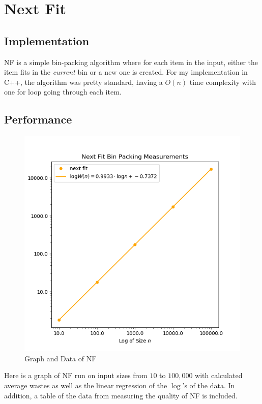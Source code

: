 \documentclass{article}
\begin{document}
\section{Next Fit}
\subsection{Implementation}
    NF is a simple bin-packing algorithm where for each item in the input, 
    either the item fits in the \textit{current} bin or a new one is created. 
    For my implementation in C++, the algorithm was pretty standard, having a
    $O(n)$ time complexity with one for loop going through each item.
\subsection{Performance}
    \begin{figure}[H]
        \centering
        \includegraphics[scale=0.60]{"../images/next-fit"}
        \caption{Graph and Data of NF}
    \end{figure}
    Here is a graph of NF run on input sizes from $10$ to $100,000$ with 
    calculated average wastes as well as the linear regression of the $\log$'s
    of the data. In addition, a table of the data from measuring the quality of
    NF is included.
\end{document}
